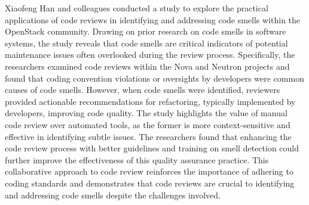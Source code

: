 \par
Xiaofeng Han and colleagues conducted a study \cite{han2021understanding} to explore the practical applications of code reviews in identifying and addressing code smells within the OpenStack community. Drawing on prior research on code smells in software systems, the study reveals that code smells are critical indicators of potential maintenance issues often overlooked during the review process. Specifically, the researchers examined code reviews within the Nova and Neutron projects and found that coding convention violations or oversights by developers were common causes of code smells. However, when code smells were identified, reviewers provided actionable recommendations for refactoring, typically implemented by developers, improving code quality.  The study highlights the value of manual code review over automated tools, as the former is more context-sensitive and effective in identifying subtle issues. The researchers found that enhancing the code review process with better guidelines and training on smell detection could further improve the effectiveness of this quality assurance practice. This collaborative approach to code review reinforces the importance of adhering to coding standards and demonstrates that code reviews are crucial to identifying and addressing code smells despite the challenges involved.




